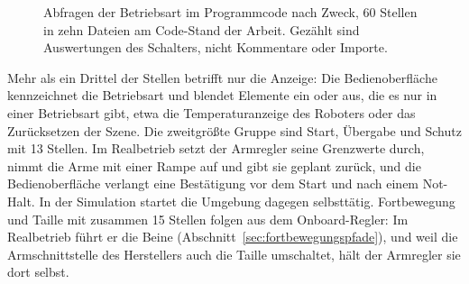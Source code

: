 \begin{figure}[htbp]
  \centering
  
  \caption[Abfragen der Betriebsart im Programmcode nach Zweck]{Abfragen der Betriebsart im Programmcode nach Zweck, 60 Stellen in zehn Dateien am Code-Stand der Arbeit. Gezählt sind Auswertungen des Schalters, nicht Kommentare oder Importe.}
  \label{fig:betriebsart}
\end{figure}

Mehr als ein Drittel der Stellen betrifft nur die Anzeige: Die Bedienoberfläche kennzeichnet die Betriebsart und blendet Elemente ein oder aus, die es nur in einer Betriebsart gibt, etwa die Temperaturanzeige des Roboters oder das Zurücksetzen der Szene.
Die zweitgrößte Gruppe sind Start, Übergabe und Schutz mit 13 Stellen.
Im Realbetrieb setzt der Armregler seine Grenzwerte durch, nimmt die Arme mit einer Rampe auf und gibt sie geplant zurück, und die Bedienoberfläche verlangt eine Bestätigung vor dem Start und nach einem Not-Halt.
In der Simulation startet die Umgebung dagegen selbsttätig.
Fortbewegung und Taille mit zusammen 15 Stellen folgen aus dem Onboard-Regler: Im Realbetrieb führt er die Beine (Abschnitt~\ref{sec:fortbewegungspfade}), und weil die Armschnittstelle des Herstellers auch die Taille umschaltet, hält der Armregler sie dort selbst.
